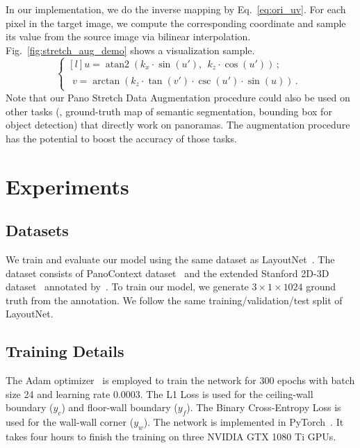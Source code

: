 \documentclass[10pt,twocolumn,letterpaper]{article}
\DeclareMathOperator{\atantwo}{atan2}
\begin{document}
In our implementation, we do the inverse mapping by Eq.~\ref{eq:ori_uv}. For each pixel in the target image, we compute the corresponding coordinate and sample its value from the source image via bilinear interpolation. Fig.~\ref{fig:stretch_aug_demo} shows a visualization sample.
\begin{equation} \label{eq:ori_uv}
\left\{\begin{matrix*}[l]
u = \atantwo(k_x \cdot \sin(u'), ~~ k_z \cdot \cos(u')) \,; \\ 
\begin{aligned}
v = \arctan(k_z \cdot \tan(v') \cdot \csc(u') \cdot \sin(u)) \,.
\end{aligned}
\end{matrix*}\right.
\end{equation}
Note that our Pano Stretch Data Augmentation procedure could also be used on other tasks (\eg, ground-truth map of semantic segmentation, bounding box for object detection) that directly work on panoramas. The augmentation procedure has the potential to boost the accuracy of those tasks.
  
\section{Experiments}\label{sssec:exp}

\subsection{Datasets}
We train and evaluate our model using the same dataset as LayoutNet~\cite{zou2018layoutnet}.
The dataset consists of PanoContext dataset~\cite{zhang2014panocontext} and the extended Stanford 2D-3D dataset~\cite{2017arXiv170201105A} annotated by~\cite{zou2018layoutnet}.
To train our model, we generate $3 \times 1 \times 1024$ ground truth from the annotation.
We follow the same training/validation/test split of LayoutNet.

\subsection{Training Details}
The Adam optimizer~\cite{adam} is employed to train the network for 300 epochs with batch size 24 and learning rate 0.0003.
The L1 Loss is used for the ceiling-wall boundary ($y_c$) and floor-wall boundary ($y_f$).
The Binary Cross-Entropy Loss is used for the wall-wall corner ($y_w$).
The network is implemented in PyTorch~\cite{paszke2017automatic}.
It takes four hours to finish the training on three NVIDIA GTX 1080 Ti GPUs.
\end{document}
